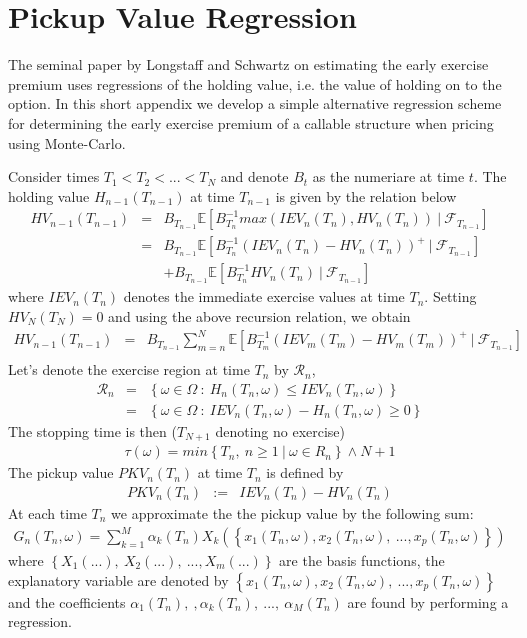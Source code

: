 \chapter{Pickup Value Regression} \label{appendix:mc_regressions}

The seminal paper by Longstaff and Schwartz \cite{ARTICLE:LS} on estimating the early exercise premium uses regressions of the holding value, i.e. the value of holding on 
to the option. In this short appendix we develop a simple alternative regression scheme for determining the early exercise premium of a callable structure when pricing using Monte-Carlo.

Consider times $T_1 < T_2 < ... < T_{N}$ and denote $B_t$ as the numeriare at time $t$. The holding value $H_{n-1}(T_{n-1})$ at time $T_{n-1}$ is given by the relation below
\begin{eqnarray}
HV_{n-1}(T_{n-1}) &=& B_{T_{n-1}}\mathbb E \left[ B_{T_n}^{-1}max(IEV_n(T_n), HV_n(T_n)) ~|~ \mathcal F_{T_{n-1}} \right] \nonumber \\
        &=& B_{T_{n-1}}\mathbb E \left[ B_{T_n}^{-1} (IEV_n(T_n)-HV_n(T_n))^{+} ~|~ \mathcal F_{T_{n-1}} \right] \nonumber \\
        & & + B_{T_{n-1}}\mathbb E \left[ B_{T_n}^{-1} HV_n(T_n) ~|~ \mathcal F_{T_{n-1}} \right]
\end{eqnarray}
where $IEV_{n}(T_n)$ denotes the immediate exercise values at time $T_n$. Setting $HV_N(T_N) = 0$ and using the above recursion relation, we obtain
\begin{eqnarray}
HV_{n-1}(T_{n-1}) &=& B_{T_{n-1}} \sum_{m=n}^{N} \mathbb E \left[ B_{T_m}^{-1} (IEV_m(T_m)-HV_m(T_m))^{+} ~|~ \mathcal F_{T_{n-1}} \right] \nonumber \\
                  & &
\end{eqnarray}
Let's denote the exercise region at time $T_n$ by $\mathcal R_n$,
\begin{eqnarray}
\mathcal R_n &=& \left\{ \omega \in \Omega ~:~ H_n(T_n,\omega) \le IEV_n(T_n,\omega) \right\} \\
             &=& \left\{ \omega \in \Omega ~:~ IEV_n(T_n,\omega)-H_n(T_n,\omega) \ge 0 \right\} 
\end{eqnarray}
The stopping time is then ($T_{N+1}$ denoting no exercise)
\begin{eqnarray}
\tau(\omega) = min \left\{ T_n, ~ n \ge 1 ~|~ \omega \in R_n \right\} \wedge N+1
\end{eqnarray}
The pickup value $PKV_{n}(T_n)$ at time $T_n$ is defined by 
\begin{eqnarray}
PKV_n(T_n) &:=& IEV_n(T_n)-HV_n(T_n)
\end{eqnarray}
At each time $T_n$ we approximate the the pickup value by the following sum:
\begin{eqnarray}
G_n(T_n, \omega) = \sum_{k=1}^M \alpha_k(T_n) X_k(\left\{x_1(T_n,\omega),x_2(T_n,\omega),~...,x_p(T_n,\omega)\right\})
\end{eqnarray}
where $\left\{X_1(...),~X_2(...),~...,X_m(...)\right\}$ are the basis functions, the explanatory variable are denoted by $\left\{x_1(T_n,\omega),x_2(T_n,\omega),~...,x_p(T_n,\omega)\right\}$ and the coefficients $\alpha_1(T_n),~,\alpha_k(T_n),~...,~\alpha_M(T_n)$ are found by performing a regression.

